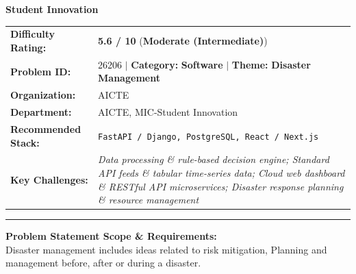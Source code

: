 \documentclass[10pt,a4paper]{article}
\begin{document}
\begin{tcolorbox}[pscard, title={"\textbf{SIH26206} \quad $\vert$ \quad Student Innovation}]
\textbf{\large Student Innovation}\\[0.25cm]

\begin{tabular}{@{}lp{12.5cm}@{}}
\textbf{Difficulty Rating:} & \textcolor{diffmod}{\textbf{\Large 5.6 / 10}} \quad (\textbf{Moderate (Intermediate)}) \\
\textbf{Problem ID:} & 26206 \quad $\vert$ \quad \textbf{Category:} \textbf{Software} \quad $\vert$ \quad \textbf{Theme:} \textbf{Disaster Management} \\
\textbf{Organization:} & AICTE \\
\textbf{Department:} & AICTE, MIC-Student Innovation \\
\textbf{Recommended Stack:} & \texttt{FastAPI / Django, PostgreSQL, React / Next.js} \\
\textbf{Key Challenges:} & \textit{\small Data processing \& rule-based decision engine; Standard API feeds \& tabular time-series data; Cloud web dashboard \& RESTful API microservices; Disaster response planning \& resource management} \\
\end{tabular}

\vspace{0.2cm}
\hrule
\vspace{0.2cm}

\textbf{\color{sihnavy}Problem Statement Scope \& Requirements:}\\[0.15cm]
\noindent\small Disaster management includes ideas related to risk mitigation, Planning and management before, after or during a disaster.\par\vspace{0.06cm}

\end{tcolorbox}
\vspace{0.4cm}
\end{document}
